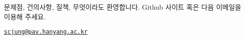 \begin{center}
\end{center}

문제점, 건의사항, 질책, 무엇이라도 환영합니다. \textsf{Github} 사이트 혹은 다음
이메일을 이용해 주세요.

\begin{center}
\href{mailto:scjung@pav.hanyang.ac.kr}{\texttt{scjung@pav.hanyang.ac.kr}}
\end{center}


